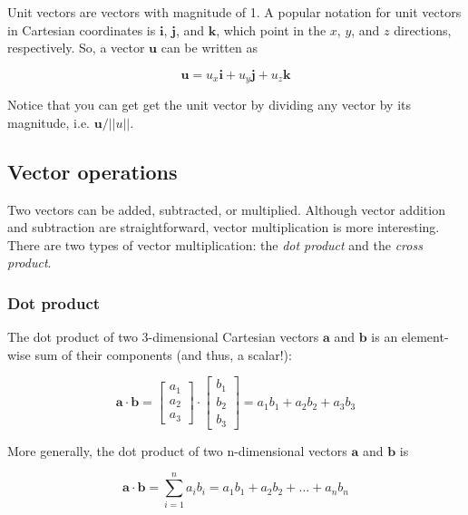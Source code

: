 \documentclass[12pt]{article}
\numberwithin{equation}{section}
\numberwithin{figure}{section}
\numberwithin{table}{section}
\begin{document}
Unit vectors are vectors with magnitude of 1.
A popular notation for unit vectors in Cartesian coordinates is $\mathbf{i}$,
$\mathbf{j}$, and $\mathbf{k}$, which point in the $x$, $y$, and $z$ directions,
respectively.
So, a vector $\mathbf{u}$ can be written as

\begin{equation}
  \mathbf{u} = u_x \mathbf{i} + u_y \mathbf{j} + u_z \mathbf{k}
\end{equation}

Notice that you can get get the unit vector by dividing any vector by its
magnitude, i.e. $\mathbf{u}/||u||$.

\subsection{Vector operations}

Two vectors can be added, subtracted, or multiplied.
Although vector addition and subtraction are straightforward, vector
multiplication is more interesting.
There are two types of vector multiplication: the \textit{dot product} and the
\textit{cross product}.

\subsubsection{Dot product}

The dot product of two 3-dimensional Cartesian vectors
$\mathbf{a}$ and $\mathbf{b}$ is an element-wise sum of their components
(and thus, a scalar!):

\begin{equation}
  \mathbf{a} \cdot \mathbf{b} =
  \begin{bmatrix}
    a_1 \\
    a_2 \\
    a_3
  \end{bmatrix}
  \cdot
  \begin{bmatrix}
    b_1 \\
    b_2 \\
    b_3
  \end{bmatrix}
  = a_1 b_1 + a_2 b_2 + a_3 b_3
\end{equation}

More generally, the dot product of two n-dimensional vectors $\mathbf{a}$ and
$\mathbf{b}$ is

\begin{equation}
  \mathbf{a} \cdot \mathbf{b} = \sum_{i=1}^{n} a_i b_i = a_1 b_1 + a_2 b_2 + \ldots + a_n b_n
\end{equation}
\end{document}

